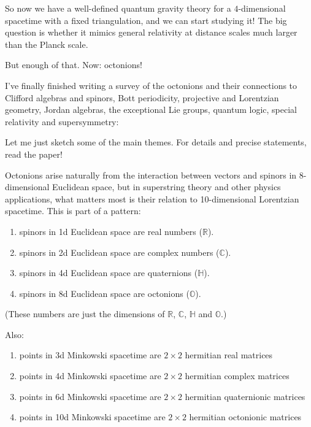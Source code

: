 \documentclass{article}
\def\tightlist{}
\renewcommand{\texttt}[1]{%
  \begingroup
  \ttfamily
  \begingroup\lccode`~=`/\lowercase{\endgroup\def~}{/\discretionary{}{}{}}%
  \begingroup\lccode`~=`[\lowercase{\endgroup\def~}{[\discretionary{}{}{}}%
  \begingroup\lccode`~=`.\lowercase{\endgroup\def~}{.\discretionary{}{}{}}%
  \catcode`/=\active\catcode`[=\active\catcode`.=\active
  \scantokens{#1\noexpand}%
  \endgroup
}
\begin{document}
So now we have a well-defined quantum gravity theory for a
\(4\)-dimensional spacetime with a fixed triangulation, and we can start
studying it! The big question is whether it mimics general relativity at
distance scales much larger than the Planck scale.

But enough of that. Now: octonions!

I've finally finished writing a survey of the octonions and their
connections to Clifford algebras and spinors, Bott periodicity,
projective and Lorentzian geometry, Jordan algebras, the exceptional Lie
groups, quantum logic, special relativity and supersymmetry:


Let me just sketch some of the main themes. For details and precise
statements, read the paper!

Octonions arise naturally from the interaction between vectors and
spinors in \(8\)-dimensional Euclidean space, but in superstring theory
and other physics applications, what matters most is their relation to
10-dimensional Lorentzian spacetime. This is part of a pattern:

\begin{enumerate}
\def\labelenumi{\arabic{enumi})}
\tightlist
\item
  spinors in 1d Euclidean space are real numbers (\(\mathbb{R}\)).
\item
  spinors in 2d Euclidean space are complex numbers (\(\mathbb{C}\)).
\item
  spinors in 4d Euclidean space are quaternions (\(\mathbb{H}\)).
\item
  spinors in 8d Euclidean space are octonions (\(\mathbb{O}\)).
\end{enumerate}

(These numbers are just the dimensions of \(\mathbb{R}\),
\(\mathbb{C}\), \(\mathbb{H}\) and \(\mathbb{O}\).)

Also:

\begin{enumerate}
\def\labelenumi{\arabic{enumi})}
\tightlist
\item
  points in 3d Minkowski spacetime are \(2\times2\) hermitian real
  matrices
\item
  points in 4d Minkowski spacetime are \(2\times2\) hermitian complex
  matrices
\item
  points in 6d Minkowski spacetime are \(2\times2\) hermitian
  quaternionic matrices
\item
  points in 10d Minkowski spacetime are \(2\times2\) hermitian
  octonionic matrices
\end{enumerate}
\end{document}
